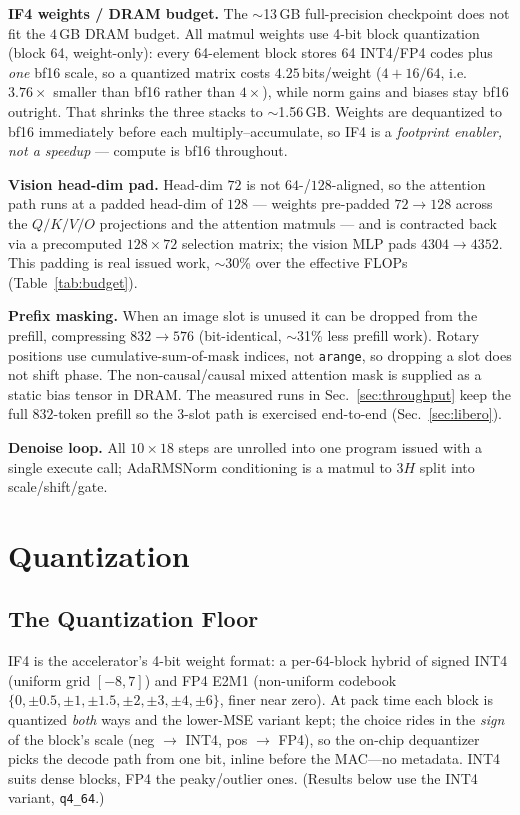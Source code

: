 \documentclass[11pt]{article}
\newcommand{\iffour}{IF4}
\newcommand{\bfteen}{bf16}
\begin{document}
\textbf{\iffour{} weights / DRAM budget.} The $\sim$13\,GB full-precision
checkpoint
does not fit the $4$\,GB DRAM budget. All
matmul weights use 4-bit block quantization (block 64, weight-only): every
64-element block stores 64 INT4/FP4 codes plus \emph{one} \bfteen{} scale, so
a quantized matrix costs $4.25$\,bits/weight ($4+16/64$, i.e.\ $3.76\times$
smaller than \bfteen{} rather than $4\times$), while norm gains and biases
stay \bfteen{} outright. That shrinks the three stacks to $\sim$1.56\,GB.
Weights are dequantized to
\bfteen{} immediately before each multiply--accumulate, so \iffour{} is a
\emph{footprint enabler, not a speedup} --- compute is \bfteen{} throughout.

\textbf{Vision head-dim pad.} Head-dim $72$ is not $64$-/$128$-aligned, so the
attention path runs at a padded head-dim of $128$ --- weights pre-padded
$72{\to}128$ across the $Q/K/V/O$ projections and the attention matmuls ---
and is contracted back via a precomputed $128{\times}72$ selection matrix; the
vision MLP pads $4304{\to}4352$. This padding is real issued work, $\sim$30\%
over the effective FLOPs (Table~\ref{tab:budget}).

\textbf{Prefix masking.} When an image slot is unused it can be dropped from
the prefill, compressing $832{\to}576$ (bit-identical, $\sim$31\% less
prefill work). Rotary positions use
cumulative-sum-of-mask indices, not \texttt{arange}, so dropping a slot does
not shift phase. The non-causal/causal mixed attention mask is supplied as a
static bias tensor in DRAM. The measured runs in Sec.~\ref{sec:throughput}
keep the full $832$-token prefill so the 3-slot path is exercised end-to-end
(Sec.~\ref{sec:libero}).

\textbf{Denoise loop.} All $10{\times}18$ steps are unrolled into one program
issued with a single execute call; AdaRMSNorm conditioning is a matmul to $3H$
split into scale/shift/gate.

\section{Quantization}
\label{sec:quant}
\subsection{The Quantization Floor}
\iffour{} is the accelerator's 4-bit weight format: a per-64-block hybrid of
signed INT4 (uniform grid $[-8,7]$) and FP4 E2M1 (non-uniform codebook
$\{0,\pm0.5,\pm1,\pm1.5,\pm2,\pm3,\pm4,\pm6\}$, finer near zero). At pack time
each block is quantized \emph{both} ways and the lower-MSE variant kept; the
choice rides in the \emph{sign} of the block's scale (neg $\to$ INT4, pos $\to$
FP4), so the on-chip dequantizer picks the decode path from one bit, inline
before the MAC---no metadata. INT4 suits dense blocks, FP4 the peaky/outlier
ones. (Results below use the INT4 variant, \texttt{q4\_64}.)
\end{document}
